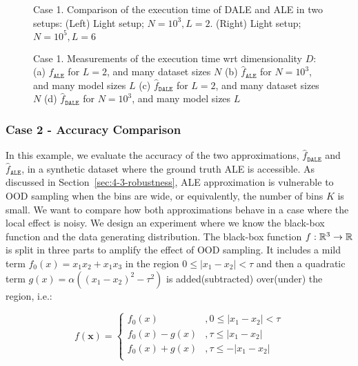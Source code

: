\documentclass[wcp]{jmlr}
\newcommand{\dale}{\hat{f}_{\mathtt{DALE}}}
\begin{document}
\begin{figure}[h]
  \centering
  \resizebox{.4\columnwidth}{!}{}
  \resizebox{.43\columnwidth}{!}{}
  \caption[Case-1-fig-1]{Case 1. Comparison of the execution time of DALE
    and ALE in two setups: (Left) Light setup; \(N=10^3, L=2\).
    (Right) Light setup; \(N=10^5, L=6\)}
  \label{fig:case-1-plots-1}
\end{figure}

\begin{figure}[h]
  \centering
  \resizebox{.23\columnwidth}{!}{}
  \resizebox{.23\columnwidth}{!}{}
  \resizebox{.23\columnwidth}{!}{}
  \resizebox{.23\columnwidth}{!}{}
  \caption[Case-1-fig-2]{Case 1. Measurements of the execution time wrt dimensionality \(D\):
    (a) \(\hat{f}_{\mathtt{ALE}}\) for \(L = 2\), and many dataset sizes \(N\)
    (b) \(\hat{f}_{\mathtt{ALE}}\) for \(N = 10^3\), and many model sizes \(L\)
    (c) \(\dale\) for \(L = 2\), and many dataset sizes \(N\)
    (d) \(\dale\) for \(N = 10^3\), and many model sizes \(L\)
  }
  \label{fig:case-1-plots-2}
\end{figure}


\subsubsection{Case 2 - Accuracy Comparison}
\label{sec:example2}

In this example, we evaluate the accuracy of the two approximations,
\(\dale\) and \(\hat{f}_{\mathtt{ALE}}\), in a synthetic
dataset where the ground truth ALE is accessible. As discussed in
Section~\ref{sec:4-3-robustness}, ALE approximation is vulnerable to
OOD sampling when the bins are wide, or equivalently, the number of
bins \(K\) is small. We want to compare how both approximations behave
in a case where the local effect is noisy.
%
We design an experiment where we know the black-box function and the
data generating distribution. The black-box function
\(f:\mathbb{R}^3 \rightarrow \mathbb{R}\) is split in three parts to amplify the
effect of OOD sampling. It includes a mild term
\( f_0(x) = x_1x_2 + x_1x_3 \) in the region
\( 0 \leq |x_1 - x_2| < \tau \) and then a quadratic term
\(g(x) = \alpha ((x_1 - x_2)^2 - \tau^2)\) is added(subtracted)
over(under) the region, i.e.:

\begin{equation} \label{eq:example-2-mapping}
  f(\mathbf{x}) =
  \begin{cases}
    f_0(x) & , 0 \leq |x_1 - x_2|  < \tau \\
    f_0(x) - g(x) & , \tau \leq |x_1 - x_2|  \\
    f_0(x) + g(x) & , \tau \leq - |x_1 - x_2|  \\
  \end{cases}
\end{equation}
\end{document}
